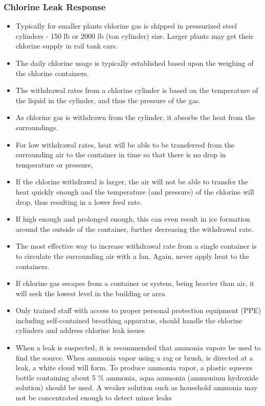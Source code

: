 \documentclass{article}
\begin{document}
\subsubsection{Chlorine Leak Response}
\begin{itemize}
	\item Typically for smaller plants chlorine gas is shipped in  pressurized steel cylinders - 150 lb or 2000 lb (ton cylinder) size.  Larger plants may get their chlorine supply in rail tank cars.  
	\item The daily chlorine usage is typically established based upon the weighing of the chlorine containers.
	\item The withdrawal rates from a chlorine cylinder is based on the temperature of the liquid in the cylinder, and thus the pressure of the gas. 
	\item As chlorine gas is withdrawn from the cylinder, it absorbs the heat from the surroundings.
	\item For low withdrawal rates, heat will be able to be transferred from the surrounding air to the container in time so that there is no drop in temperature or pressure, 
	\item If the chlorine withdrawal is larger, the air will not be able to transfer the heat quickly enough and the temperature (and pressure) of the chlorine will drop, thus resulting in a lower feed rate. 
	\item If high enough and prolonged enough, this can even result in ice formation around the outside of the container, further decreasing the withdrawal rate. 
	\item The most effective way to increase withdrawal rate from a single container is to circulate the surrounding air with a fan. Again, never apply heat to the containers.
	\item If chlorine gas escapes from a container or system, being heavier than air, it will seek the lowest level in the building or area
	\item Only trained staff with access to proper personal protection equipment (PPE) including self-contained breathing apparatus, should handle the chlorine cylinders and address chlorine leak issues 
	\item When a leak is suspected, it is recommended that ammonia vapors be used to find the source. When ammonia vapor using a rag or brush, is directed at a leak, a white cloud will form. To produce ammonia vapor, a plastic squeeze bottle containing about 5 \% ammonia, aqua ammonia (ammonium hydroxide solution) should be used. A weaker solution such as household ammonia may not be concentrated enough to detect minor leaks

\end{itemize}
\end{document}
